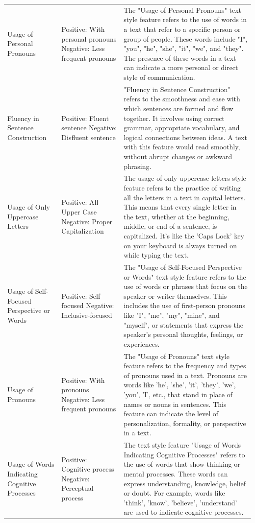 {{\begin{longtable}{p{4cm} p{4cm} p{6.5cm}}
Usage of Personal Pronouns & Positive: With personal pronouns \newline Negative: Less frequent pronouns & The "Usage of Personal Pronouns" text style feature refers to the use of words in a text that refer to a specific person or group of people. These words include "I", "you", "he", "she", "it", "we", and "they". The presence of these words in a text can indicate a more personal or direct style of communication. \\
Fluency in Sentence Construction & Positive: Fluent sentence \newline Negative: Disfluent sentence & "Fluency in Sentence Construction" refers to the smoothness and ease with which sentences are formed and flow together. It involves using correct grammar, appropriate vocabulary, and logical connections between ideas. A text with this feature would read smoothly, without abrupt changes or awkward phrasing. \\
Usage of Only Uppercase Letters & Positive: All Upper Case \newline Negative: Proper Capitalization & The usage of only uppercase letters style feature refers to the practice of writing all the letters in a text in capital letters. This means that every single letter in the text, whether at the beginning, middle, or end of a sentence, is capitalized. It's like the 'Caps Lock' key on your keyboard is always turned on while typing the text. \\
Usage of Self-Focused Perspective or Words & Positive: Self-focused \newline Negative: Inclusive-focused & The "Usage of Self-Focused Perspective or Words" text style feature refers to the use of words or phrases that focus on the speaker or writer themselves. This includes the use of first-person pronouns like "I", "me", "my", "mine", and "myself", or statements that express the speaker's personal thoughts, feelings, or experiences. \\
Usage of Pronouns & Positive: With pronouns \newline Negative: Less frequent pronouns & The "Usage of Pronouns" text style feature refers to the frequency and types of pronouns used in a text. Pronouns are words like 'he', 'she', 'it', 'they', 'we', 'you', 'I', etc., that stand in place of names or nouns in sentences. This feature can indicate the level of personalization, formality, or perspective in a text. \\
Usage of Words Indicating Cognitive Processes & Positive: Cognitive process \newline Negative: Perceptual process & The text style feature "Usage of Words Indicating Cognitive Processes" refers to the use of words that show thinking or mental processes. These words can express understanding, knowledge, belief or doubt. For example, words like 'think', 'know', 'believe', 'understand' are used to indicate cognitive processes. \\

\end{longtable}}}
